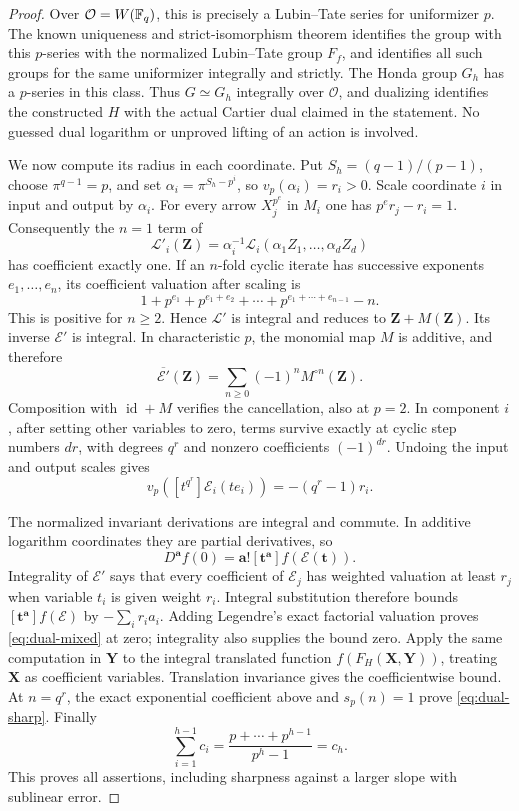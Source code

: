 \documentclass[11pt,a4paper]{article}
\theoremstyle{definition}\newtheorem{remark}[theorem]{Remark}
\newcommand{\id}{\operatorname{id}}\newcommand{\Hom}{\operatorname{Hom}}
\begin{document}
\begin{proof}
Over $\mathcal O=W(\mathbb F_q)$, this is precisely a Lubin--Tate series for uniformizer $p$. The known uniqueness and strict-isomorphism theorem \cite[\S5, pp.~76--77, (5.1)--(5.4)]{Hazewinkel} identifies the group with this $p$-series with the normalized Lubin--Tate group $F_f$, and identifies all such groups for the same uniformizer integrally and strictly. The Honda group $G_h$ has a $p$-series in this class. Thus $G\simeq G_h$ integrally over $\mathcal O$, and dualizing identifies the constructed $H$ with the actual Cartier dual claimed in the statement. No guessed dual logarithm or unproved lifting of an action is involved.

We now compute its radius in each coordinate. Put $S_h=(q-1)/(p-1)$, choose $\pi^{q-1}=p$, and set $\alpha_i=\pi^{S_h-p^i}$, so $v_p(\alpha_i)=r_i>0$. Scale coordinate $i$ in input and output by $\alpha_i$. For every arrow $X_j^{p^e}$ in $M_i$ one has $p^er_j-r_i=1$. Consequently the $n=1$ term of
\[
 \mathcal L'_i(\mathbf Z)=\alpha_i^{-1}\mathcal L_i(\alpha_1Z_1,\ldots,\alpha_dZ_d)
\]
has coefficient exactly one. If an $n$-fold cyclic iterate has successive exponents $e_1,\ldots,e_n$, its coefficient valuation after scaling is
\[
 1+p^{e_1}+p^{e_1+e_2}+\cdots+p^{e_1+\cdots+e_{n-1}}-n.
\]
This is positive for $n\ge2$. Hence $\mathcal L'$ is integral and reduces to $\mathbf Z+M(\mathbf Z)$. Its inverse $\mathcal E'$ is integral. In characteristic $p$, the monomial map $M$ is additive, and therefore
\[
 \overline{\mathcal E'}(\mathbf Z)=\sum_{n\ge0}(-1)^nM^{\circ n}(\mathbf Z).
\]
Composition with $\id+M$ verifies the cancellation, also at $p=2$. In component $i$, after setting other variables to zero, terms survive exactly at cyclic step numbers $dr$, with degrees $q^r$ and nonzero coefficients $(-1)^{dr}$. Undoing the input and output scales gives
\[
 v_p([t^{q^r}]\mathcal E_i(t e_i))=-(q^r-1)r_i.
\]

The normalized invariant derivations are integral and commute. In additive logarithm coordinates they are partial derivatives, so
\[
 D^{\mathbf a}f(0)=\mathbf a![\mathbf t^{\mathbf a}]f(\mathcal E(\mathbf t)).
\]
Integrality of $\mathcal E'$ says that every coefficient of $\mathcal E_j$ has weighted valuation at least $r_j$ when variable $t_i$ is given weight $r_i$. Integral substitution therefore bounds $[\mathbf t^{\mathbf a}]f(\mathcal E)$ by $-\sum_i r_i a_i$. Adding Legendre's exact factorial valuation proves \eqref{eq:dual-mixed} at zero; integrality also supplies the bound zero. Apply the same computation in $\mathbf Y$ to the integral translated function $f(F_H(\mathbf X,\mathbf Y))$, treating $\mathbf X$ as coefficient variables. Translation invariance gives the coefficientwise bound. At $n=q^r$, the exact exponential coefficient above and $s_p(n)=1$ prove \eqref{eq:dual-sharp}. Finally
\[
 \sum_{i=1}^{h-1}c_i=\frac{p+\cdots+p^{h-1}}{p^h-1}=c_h.
\]
This proves all assertions, including sharpness against a larger slope with sublinear error.
\end{proof}
\end{document}
